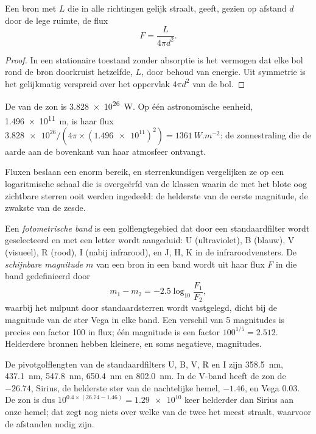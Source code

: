 \begin{proposition}\label{prop:b1:observing-the-sky:inverse-square}
Een bron met  $L$ die in alle richtingen gelijk straalt, geeft, gezien op
afstand $d$ door de lege ruimte, de flux
\[
  F = \frac{L}{4\pi d^2} .
\]
\end{proposition}

\begin{proof}
In een stationaire toestand zonder absorptie is het vermogen dat elke bol rond de bron
doorkruist hetzelfde, $L$, door behoud van energie. Uit symmetrie is het gelijkmatig
verspreid over het oppervlak $4\pi d^2$ van de bol.
\end{proof}

\begin{example}
De  van de zon is \qty{3.828e26}{W}. Op één astronomische eenheid,
\qty{1.496e11}{m}, is haar flux $\num{3.828e26}/(4\pi\times
(\num{1.496e11})^2) = \qty{1361}{W.m^{-2}}$: de zonnestraling die de aarde aan de
bovenkant van haar atmosfeer ontvangt.
\end{example}

Fluxen beslaan een enorm bereik, en sterrenkundigen vergelijken ze op een logaritmische
schaal die is overgeërfd van de klassen waarin de met het blote oog zichtbare sterren
ooit werden ingedeeld: de helderste van de eerste magnitude, de zwakste van de zesde.

\begin{definition}\label{def:b1:observing-the-sky:magnitude}
Een \emph{fotometrische band} is een golflengtegebied dat door
een standaardfilter wordt geselecteerd en met een letter wordt aangeduid: U (ultraviolet),
B (blauw), V (visueel), R (rood), I (nabij infrarood), en J, H, K in de infraroodvensters.
De \emph{schijnbare magnitude} $m$ van een bron in een band
wordt uit haar flux $F$ in die band gedefinieerd door
\[
  m_1 - m_2 = -2.5\log_{10}\frac{F_1}{F_2} ,
\]
waarbij het nulpunt door standaardsterren wordt vastgelegd, dicht bij de magnitude van
de ster Vega in elke band. Een verschil van 5 magnitudes is precies een factor 100 in
flux; één magnitude is een factor $100^{1/5} = 2.512$. Helderdere bronnen hebben kleinere,
en soms negatieve, magnitudes.
\end{definition}

De pivotgolflengten van de standaardfilters U, B, V, R en I zijn
\qty{358.5}{nm}, \qty{437.1}{nm}, \qty{547.8}{nm}, \qty{650.4}{nm} en
\qty{802.0}{nm}.
In de V-band heeft de zon de  $-26.74$, Sirius, de helderste ster van
de nachtelijke hemel, $-1.46$, en Vega $0.03$. De zon is dus
$10^{0.4\times(26.74 - 1.46)} = \num{1.29e10}$ keer helderder dan Sirius aan onze hemel;
dat zegt nog niets over welke van de twee het meest straalt, waarvoor de afstanden nodig zijn.

